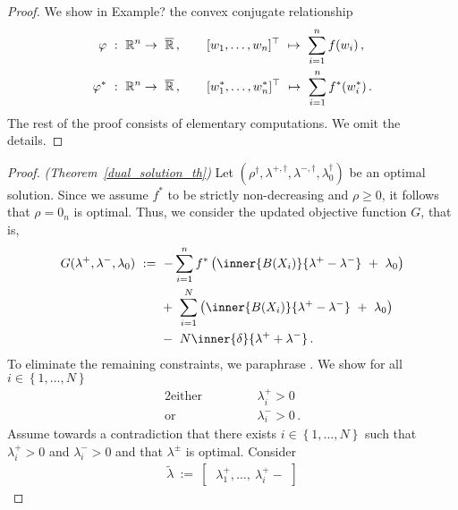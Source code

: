 \begin{proof}
  We show in Example? the convex conjugate relationship
\begin{align*}
  \varphi
  &
  \ 
  :
  \ 
  \R^n
  \to
  \ 
  \overline{\R}
  \,
  ,
  \qquad
  [w_1,\ldots,w_n]^\top
  \ 
  \mapsto
  \ 
  \sum_{i=1}^n f(w_i)
  \,,
  \\
  \varphi^*
  &
  \ 
  :
  \ 
  \R^n
  \to
  \ 
  \overline{\R}
  \,
  ,
  \qquad
  [w^*_1,\ldots,w^*_n]^\top
  \ 
  \mapsto
  \ 
  \sum_{i=1}^n f^*(w^*_i)
  \,.
\end{align*}
  The rest of the proof consists of elementary computations. We omit the details.
\end{proof}
\begin{proof}\emph{(Theorem~\ref{dual_solution_th})}
  Let 
  $
(\rho^\dagger,\lambda^{+,\dagger},\lambda^{-,\dagger},\lambda_0^\dagger)
  $
  be an optimal solution.
  Since we assume $f^*$ to be strictly non-decreasing and $\rho\ge0$, it follows that $\rho=\mathrm{0}_n$ is optimal.
  Thus, we consider the updated objective function $G$, that is,
\begin{align*}
  G(\lambda^+,\lambda^-,\lambda_0)
  &
  \ 
  :=
  \ 
    -
    \sum_{i=1}^{n} 
    f^*
    \left( 
      \inner{B(X_i)}{\lambda^+-\lambda^-}
      \ 
      +
      \ 
      \lambda_0
    \right)
    \\
    &
    \qquad 
    +
    \ 
    \sum_{i=1}^{N} 
    \left( 
      \inner{B(X_i)}{\lambda^+-\lambda^-}
      \ 
      +
      \ 
      \lambda_0
    \right)
    \\
    &
    \qquad 
    -
    \ 
    N
    \inner{\delta}{\lambda^++\lambda^-}
    \,.
\end{align*}
  To eliminate the remaining constraints, 
  we paraphrase \cite[pages~19-20]{Wang2019}.
  We show 
  for all $i \in \left\{ 1,\ldots,N \right\}$
\begin{alignat*}{2}
  \text{either}
  &
  &&
  \qquad
      \lambda_i^+ > 0
  \\
  \text{or}
  &
  &&
  \qquad
      \lambda_i^- > 0
  \,.
\end{alignat*}
Assume towards a contradiction that 
there exists
$i \in \left\{ 1,\ldots,N \right\}$
such that
$
      \lambda_i^+ > 0
$
and
$
      \lambda_i^- > 0
$ 
and that 
$\lambda^\pm$ is optimal.
Consider
  \begin{gather}
    \tilde{\lambda}
    \ 
    :=
    \ 
    \begin{bmatrix}
      \ 
      \lambda_1^+,
      \ldots,
      \ 
      \lambda_i^+
      \!
      -

\end{bmatrix}
\end{gather}
\end{proof}
